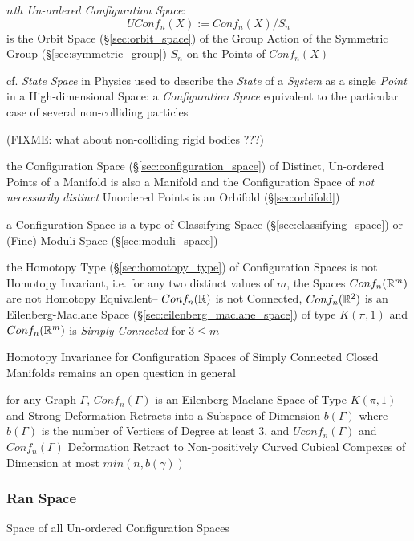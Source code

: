 \emph{$n$th Un-ordered Configuration Space}:
\[
  UConf_n(X) := Conf_n(X)/S_n
\]
is the Orbit Space (\S\ref{sec:orbit_space}) of the Group Action of the
Symmetric Group (\S\ref{sec:symmetric_group}) $S_n$ on the Points of $Conf_n(X)$

cf. \emph{State Space} in Physics used to describe the \emph{State} of a
\emph{System} as a single \emph{Point} in a High-dimensional Space: a
\emph{Configuration Space} equivalent to the particular case of several
non-colliding particles

(FIXME: what about non-colliding rigid bodies ???)

the Configuration Space (\S\ref{sec:configuration_space}) of Distinct,
Un-ordered Points of a Manifold is also a Manifold and the Configuration Space
of \emph{not necessarily distinct} Unordered Points is an Orbifold
(\S\ref{sec:orbifold})

a Configuration Space is a type of Classifying Space
(\S\ref{sec:classifying_space}) or (Fine) Moduli Space
(\S\ref{sec:moduli_space})

the Homotopy Type (\S\ref{sec:homotopy_type}) of Configuration Spaces is not
Homotopy Invariant, i.e. for any two distinct values of $m$, the Spaces
$Conf_n(\mathbb{R}^m)$ are not Homotopy Equivalent-- $Conf_n(\mathbb{R})$ is not
Connected, $Conf_n(\mathbb{R}^2)$ is an Eilenberg-Maclane Space
(\S\ref{sec:eilenberg_maclane_space}) of type $K(\pi,1)$ and $Conf_n(\mathbb{R}^m)$
is \emph{Simply Connected} for $3 \leq m$

Homotopy Invariance for Configuration Spaces of Simply Connected Closed
Manifolds remains an open question in general

for any Graph $\Gamma$, $Conf_n(\Gamma)$ is an Eilenberg-Maclane Space of Type
$K(\pi,1)$ and Strong Deformation Retracts into a Subspace of Dimension
$b(\Gamma)$ where $b(\Gamma)$ is the number of Vertices of Degree at least 3,
and $Uconf_n(\Gamma)$ and $Conf_n(\Gamma)$ Deformation Retract to
Non-positively Curved Cubical Compexes of Dimension at most $min(n,b(\gamma))$



\subsubsection{Ran Space}\label{sec:ran_space}

Space of all Un-ordered Configuration Spaces



